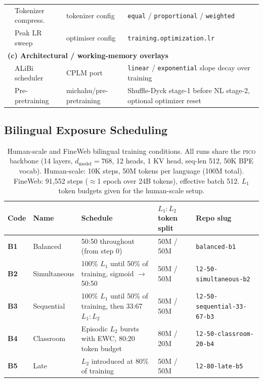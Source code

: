 \begin{table}[t]
\begin{tabular}{@{}l l l l@{}}
& Tokenizer compress.& tokenizer config        & \texttt{equal} / \texttt{proportional} / \texttt{weighted} \\
& Peak LR sweep      & optimiser config        & \texttt{training.optimization.lr} \\
\midrule
\multicolumn{4}{l}{\textbf{(c) Architectural / working-memory overlays}} \\
& ALiBi scheduler    & CPLM port               & \texttt{linear} / \texttt{exponential} slope decay over training \\
& Pre-pretraining    & michahu/pre-pretraining & Shuffle-Dyck stage-1 before NL stage-2, optional optimizer reset \\
\bottomrule
\end{tabular}
\end{table}


\subsection{Bilingual Exposure Scheduling}
\begin{table}[t]
\centering
\small
\caption{Human-scale and FineWeb bilingual training conditions. All runs share
the \textsc{pico} backbone (14 layers, $d_{\text{model}}{=}768$, 12 heads, 1 KV head,
seq-len 512, 50K BPE vocab). Human-scale: 10K steps, 50M tokens per language
(100M total). FineWeb: 91{,}552 steps ($\approx$1 epoch over 24B tokens),
effective batch 512. $L_1$ token budgets given for the human-scale setup.}
\label{tab:bilingual-conditions}
\begin{tabular}{@{}l l l l l@{}}
\toprule
Code & Name & Schedule & $L_1{:}L_2$ token split & Repo slug \\
\midrule
\textbf{B1} & Balanced      & 50:50 throughout (from step 0)                             & 50M / 50M & \texttt{balanced-b1} \\
\textbf{B2} & Simultaneous  & 100\% $L_1$ until 50\% of training, sigmoid $\to$ 50:50    & 50M / 50M & \texttt{l2-50-simultaneous-b2} \\
\textbf{B3} & Sequential    & 100\% $L_1$ until 50\% of training, then 33:67 $L_1{:}L_2$ & 50M / 50M & \texttt{l2-50-sequential-33-67-b3} \\
\textbf{B4} & Classroom     & Episodic $L_2$ bursts with EWC, 80:20 token budget         & 80M / 20M & \texttt{l2-50-classroom-20-b4} \\
\textbf{B5} & Late          & $L_2$ introduced at 80\% of training                       & 50M / 50M & \texttt{l2-80-late-b5} \\
\bottomrule
\end{tabular}
\label{tab:curricula}

\end{table}



